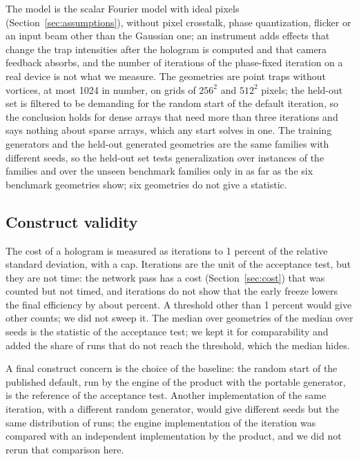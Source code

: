 The model is the scalar Fourier model with ideal pixels (Section~\ref{sec:assumptions}), without pixel crosstalk, phase quantization, flicker or an input beam other than the Gaussian one; an instrument adds effects that change the trap intensities after the hologram is computed and that camera feedback absorbs, and the number of iterations of the phase-fixed iteration on a real device is not what we measure. The geometries are point traps without vortices, at most 1024 in number, on grids of $256^2$ and $512^2$ pixels; the held-out set is filtered to be demanding for the random start of the default iteration, so the conclusion holds for dense arrays that need more than three iterations and says nothing about sparse arrays, which any start solves in one.
The training generators and the held-out generated geometries are the same families with different seeds, so the held-out set tests generalization over instances of the families and over the unseen benchmark families only in as far as the six benchmark geometries show; six geometries do not give a statistic.

\subsection{Construct validity}\label{sec:construct}

The cost of a hologram is measured as iterations to 1 percent of the relative standard deviation, with a cap. Iterations are the unit of the acceptance test, but they are not time: the network pass has a cost (Section~\ref{sec:cost}) that was counted but not timed, and iterations do not show that the early freeze lowers the final efficiency by about \effdRThree{} percent. A threshold other than 1 percent would give other counts; we did not sweep it. The median over geometries of the median over seeds is the statistic of the acceptance test; we kept it for comparability and added the share of runs that do not reach the threshold, which the median hides.

A final construct concern is the choice of the baseline: the random start of the published default, run by the engine of the product with the portable generator, is the reference of the acceptance test. Another implementation of the same iteration, with a different random generator, would give different seeds but the same distribution of runs; the engine implementation of the iteration was compared with an independent implementation by the product, and we did not rerun that comparison here.

